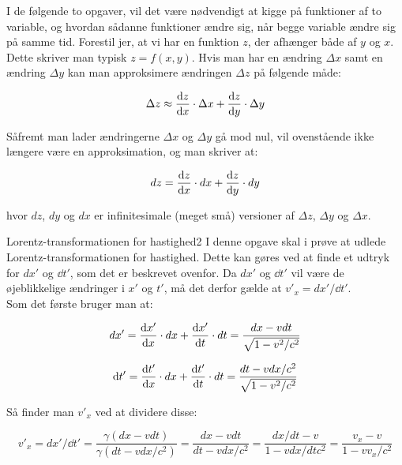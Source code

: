 \documentclass[crop=false, class=memoir]{standalone}
\begin{document}
I de følgende to opgaver, vil det være nødvendigt at kigge på funktioner af to variable, og hvordan sådanne funktioner ændre sig, når begge variable ændre sig på samme tid. 
Forestil jer, at  vi har en funktion $z$, der afhænger både af $y$ og $x$. Dette skriver man typisk $z=f \left( x,y \right)$. Hvis man har en ændring $\Delta x$ samt en ændring $\Delta y$ kan man approksimere ændringen $\Delta z$ på følgende måde:

$$\Delta z \approx \dv{z}{x} \cdot \Delta x + \dv{z}{y} \cdot \Delta y$$


Såfremt man lader ændringerne $\Delta x$ og $\Delta y$ gå mod nul, vil ovenstående ikke længere være en approksimation, og man skriver at:

$$dz = \dv{z}{x} \cdot dx + \dv{z}{y} \cdot dy$$


hvor $dz$, $dy$ og $dx$ er infinitesimale (meget små) versioner af $\Delta z$, $\Delta y$ og $\Delta x$.\\

\begin{opgave}{Lorentz-transformationen for hastighed}{2}
	I denne opgave skal i prøve at udlede Lorentz-transformationen for hastighed. Dette kan gøres ved at finde et udtryk for $dx'$ og $\dd{t'}$, som det er beskrevet ovenfor. Da $dx'$ og $\dd{t'}$ vil være de øjeblikkelige ændringer i $x'$ og $t'$, må det derfor gælde at $v'_x = dx'/\dd{t'}$.\\
	
	Som det første bruger man at:
	
	$$dx' = \dv{x'}{x} \cdot dx + \dv{x'}{t} \cdot dt = \frac{dx - v dt}{\sqrt{1- v^2 / c^2}} $$
	
	$$\dd{t'} = \dv{t'}{x} \cdot dx + \dv{t'}{t} \cdot dt = \frac{dt - v dx/c^2}{\sqrt{1- v^2 / c^2}}  $$
	
	Så finder man $v'_x$ ved at dividere disse:
	
	$$v'_x = dx'/\dd{t'} = \frac{\gamma (dx - v dt)}{\gamma (dt - v dx/c^2)} = \frac{dx - v dt}{dt - v dx/c^2} = \frac{dx/dt - v}{1 - v dx/dtc^2} = \frac{v_x - v}{1 - v v_x / c^2} $$
\end{opgave}
\end{document}
